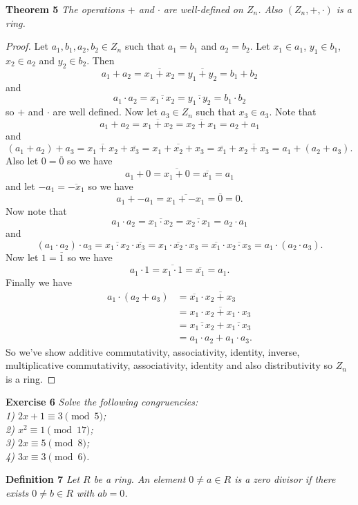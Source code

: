 \documentclass{article}
\begin{document}
\begin{flushleft}
\textbf{Theorem 5}
\textsl{The operations $+$ and $\cdot$ are well-defined on $Z_n$. Also $(Z_n, +, \cdot)$ is a ring.}
\begin{proof}
Let $a_1, b_1, a_2, b_2 \in Z_n$ such that $a_1 = b_1$ and $a_2 = b_2$. Let $x_1 \in a_1$, $y_1 \in b_1$, $x_2 \in a_2$ and $y_2 \in b_2$. Then
\[
a_1 + a_2 = \overline{x_1 + x_2} = \overline{y_1 + y_2} = b_1 + b_2
\]
and
\[
a_1 \cdot a_2 = \overline{x_1 \cdot x_2} = \overline{y_1 \cdot y_2} = b_1 \cdot b_2
\]
so $+$ and $\cdot$ are well defined. Now let $a_3 \in Z_n$ such that $x_3 \in a_3$. Note that
\[
a_1 + a_2 = \overline{x_1 + x_2} = \overline{x_2 + x_1} = a_2 + a_1
\]
and
\[
(a_1 + a_2) + a_3 = \overline{x_1 + x_2} + \overline{x_3} = \overline{x_1 + x_2 + x_3} = \overline{x_1} + \overline{x_2 + x_3} = a_1 + (a_2 + a_3).
\]
Also let $0 = \overline{0}$ so we have
\[
a_1 + 0 = \overline{x_1 + 0} = \overline{x_1} = a_1
\]
and let $-a_1 = \overline{-x_1}$ so we have
\[
a_1 + -a_1 = \overline{x_1 + -x_1} = \overline{0} = 0.
\]
Now note that
\[
a_1 \cdot a_2 = \overline{x_1 \cdot x_2} = \overline{x_2 \cdot x_1} = a_2 \cdot a_1
\]
and
\[
(a_1 \cdot a_2) \cdot a_3 = \overline{x_1 \cdot x_2} \cdot \overline{x_3} = \overline{x_1 \cdot x_2 \cdot x_3} = \overline{x_1} \cdot \overline{x_2 \cdot x_3} = a_1 \cdot (a_2 \cdot a_3).
\]
Now let $1 = \overline{1}$ so we have
\[
a_1 \cdot 1 = \overline{x_1 \cdot 1} = \overline{x_1} = a_1.
\]
Finally we have
\begin{align*}
a_1 \cdot (a_2 + a_3) &= \overline{x_1} \cdot \overline{x_2 + x_3} \\
	&= \overline{x_1 \cdot x_2 + x_1 \cdot x_3} \\
	&= \overline{x_1 \cdot x_2} + \overline{x_1 \cdot x_3} \\
	&= a_1 \cdot a_2 + a_1 \cdot a_3.
\end{align*}
So we've show additive commutativity, associativity, identity, inverse, multiplicative commutativity, associativity, identity and also distributivity so $Z_n$ is a ring.
\end{proof}

\textbf{Exercise 6}
\textsl{Solve the following congruencies:\\
1) $2x+1 \equiv 3 \pmod{5}$; \\
2) $x^2 \equiv 1 \pmod{17}$; \\
3) $2x \equiv 5 \pmod{8}$; \\
4) $3x \equiv 3 \pmod{6}$.}\newline

\textbf{Definition 7}
\textsl{Let $R$ be a ring. An element $0 \neq a \in R$ is a zero divisor if there exists $0 \neq b \in R$ with $ab=0$.}\newline


\end{flushleft}
\end{document}

